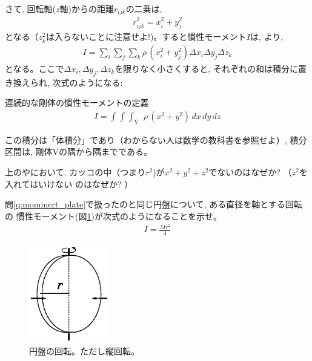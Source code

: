 さて, 回転軸($z$軸)からの距離$r_{ijk}$の二乗は, 
\begin{eqnarray}
r_{ijk}^2=x_i^2+y_j^2
\end{eqnarray}
となる（$z_k^2$は入らないことに注意せよ!)。すると慣性モーメント$I$は, より, 
\begin{eqnarray}
I=\sum_{i}^{}\sum_{j}^{}\sum_{k}^{} \rho\, (x_i^2+y_j^2) \Delta x_i \Delta y_j \Delta z_k\label{eq:mominert_rigid_sigma}
\end{eqnarray}
となる。ここで$\Delta x_i, \Delta y_j, \Delta z_k$を限りなく小さくすると, 
それぞれの和は積分に置き換えられ, 次式のようになる:
\begin{itembox}{連続的な剛体の慣性モーメントの定義}
\begin{eqnarray}
I=\int_{}^{}\int_{}^{}\int_{\text{V}}^{}\,\, \rho\,(x^2+y^2)\,dx\,dy\,dz\label{eq:mominert_rigid_integ}
\end{eqnarray}
\end{itembox}
この積分は「体積分」であり（わからない人は数学の教科書を参照せよ）, 積分区間は, 剛体Vの隅から隅までである。\mv

%
\begin{q}\label{q:mominert_r2}
上のやにおいて, 
カッコの中（つまり$r^2$)が$x^2+y^2+z^2$でないのはなぜか? （$z^2$を入れてはいけない
のはなぜか? ）
\end{q}
\mv

\begin{q}\label{q:mominert_diameter}
問\ref{q:mominert_plate}で扱ったのと同じ円盤について, ある直径を軸とする回転の
慣性モーメント(図\ref{fig:disk6})が次式のようになることを示せ。
\begin{eqnarray}
I=\frac{Mr^2}{4}\label{eq:mominert_disc_diameter}
\end{eqnarray}
\begin{figure}[h]
    \centering
    \includegraphics[width=3.5cm]{disk6.eps}
    \caption{円盤の回転。ただし縦回転。}\label{fig:disk6}
\end{figure}
\end{q}

